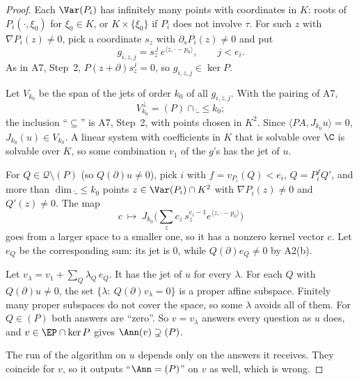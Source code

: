 \begin{proof}
Each $\Var(P_i)$ has infinitely many points with coordinates in $K$: roots of $P_i(\cdot,\xi_0)$ for $\xi_0\in K$, or $K\times\{\xi_0\}$ if $P_i$ does not involve $\tau$. For such $z$ with $\nabla P_i(z)\ne0$, pick a coordinate $s_z$ with $\partial_{s}P_i(z)\ne0$ and put
\[
g_{i,z,j}=s_z^{\,j}\,e^{\langle z,\cdot-p_0\rangle},\qquad j<e_i .
\]
As in A7, Step~2, $P(z+\partial)s_z^j=0$, so $g_{i,z,j}\in\ker P$.

Let $V_{k_0}$ be the span of the jets of order $k_0$ of all $g_{i,z,j}$. With the pairing of A7,
\[
V_{k_0}^\perp=(P)\cap\ring_{\le k_0};
\]
the inclusion ``$\subseteq$'' is A7, Step~2, with points chosen in $K^2$. Since $\langle PA,J_{k_0}u\rangle=0$, $J_{k_0}(u)\in V_{k_0}$. A linear system with coefficients in $K$ that is solvable over $\C$ is solvable over $K$, so some combination $v_1$ of the $g$'s has the jet of $u$.

For $Q\in\mathcal Q\setminus(P)$ (so $Q(\partial)u\ne0$), pick $i$ with $f=v_{P_i}(Q)<e_i$, $Q=P_i^fQ'$, and more than $\dim\ring_{\le k_0}$ points $z\in\Var(P_i)\cap K^2$ with $\nabla P_i(z)\ne0$ and $Q'(z)\ne0$. The map
\[
c\ \mapsto\ J_{k_0}\Big(\sum_zc_z\,s_z^{e_i-1}e^{\langle z,\cdot-p_0\rangle}\Big)
\]
goes from a larger space to a smaller one, so it has a nonzero kernel vector $c$. Let $e_Q$ be the corresponding sum: its jet is $0$, while $Q(\partial)e_Q\ne0$ by A2(b).

Let $v_\lambda=v_1+\sum_Q\lambda_Q\,e_Q$. It has the jet of $u$ for every $\lambda$. For each $Q$ with $Q(\partial)u\ne0$, the set $\{\lambda:\ Q(\partial)v_\lambda=0\}$ is a proper affine subspace. Finitely many proper subspaces do not cover the space, so some $\lambda$ avoids all of them. For $Q\in(P)$ both answers are ``zero''. So $v=v_\lambda$ answers every question as $u$ does, and $v\in\EP\cap\ker P$ gives $\Ann(v)\supsetneq(P)$.

The run of the algorithm on $u$ depends only on the answers it receives. They coincide for $v$, so it outputs ``$\Ann=(P)$'' on $v$ as well, which is wrong.

\end{proof}
